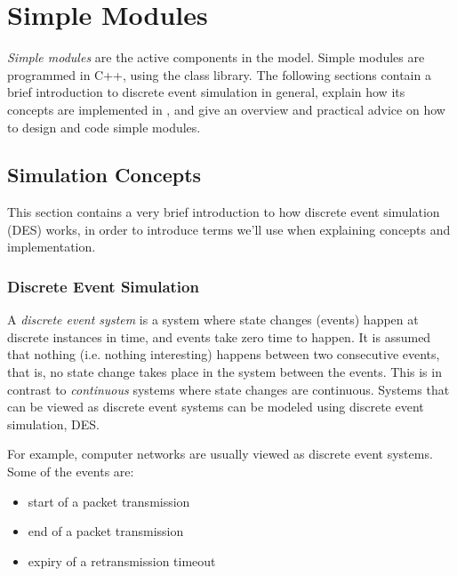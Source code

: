\chapter{Simple Modules}
\label{cha:simple-modules}


\textit{Simple modules} are the active components in the model.
Simple modules are programmed in C++, using the {\opp} class
library. The following sections contain a brief introduction
to discrete event simulation in general, explain how its concepts are
implemented in {\opp}, and give an overview and practical advice
on how to design and code simple modules.


\section{Simulation Concepts}
\label{sec:simple-modules:simulation-concepts}

This section contains a very brief introduction to how discrete
event simulation (DES) works, in order to introduce terms we'll use
when explaining {\opp} concepts and
implementation.


\subsection{Discrete Event Simulation}
\label{sec:simple-modules:discrete-event-simulation}

A \textit{discrete event system} is a system where state changes
(events) happen at discrete instances in time, and events take zero time
to happen. It is assumed that nothing (i.e. nothing interesting)
happens between two consecutive events, that is, no state change takes
place in the system between the events. This is in contrast to
\textit{continuous} systems where state changes are continuous.
Systems that can be viewed as discrete event systems can be modeled
using discrete event simulation, DES.

For example, computer networks are usually viewed as discrete
event systems. Some of the events are:

\begin{itemize}
  \item start of a packet transmission
  \item end of a packet transmission
  \item expiry of a retransmission timeout
\end{itemize}

